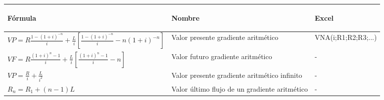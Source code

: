 \begin{center}
	\begin{tabular}{ |p{6.8cm}|p{5cm}| p{3.2cm}|}
		\hline
		\rowcolor{orange!50}
		\begin{center}\textbf{Fórmula}\end{center}                                                                                  & \begin{center}\textbf{Nombre}\end{center}                                  & \begin{center}\textbf{Excel}\end{center} \\ \hline
		
		
		$VP = R  \frac{1-(1 + i)^{-n}}{i} + \frac{L}{i}[ \frac{1-(1 + i)^{-n}}{i} - n(1 + i)^{-n} ]$\hspace{35 pt} & Valor presente gradiente aritmético                        & VNA(i;R1;R2;R3;...)       \\ \hline
		
		
		$VF = R\frac{(1+i)^n-1}{i} + \frac{L}{i}[\frac{(1+i)^n-1}{i}-n]$ \hspace{35 pt}                            & Valor futuro gradiente aritmético                                                      
		                                                                                                           & -                                                                                      \\  \hline
		
		
		$VP = \frac{R}{i} + \frac{L}{i^2}$ \hspace{35 pt}                                                          & Valor  presente gradiente aritmético infinito                                          
		                                                                                                           & -                                                                                      \\ \hline
		
		$R_{n} = R_{1} + (n-1)L$ \hspace{35 pt}                                                                    & Valor último flujo de un gradiente aritmético                                          
		                                                                                                           & -                                                                                      \\ \hline
		

\end{tabular}
\end{center}

